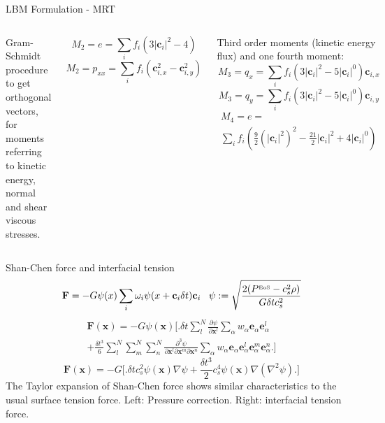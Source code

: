 \documentclass{beamer}
\begin{document}
	\begin{frame}{LBM Formulation - MRT}
		
		\begin{columns}
		Gram-Schmidt procedure to get orthogonal vectors, for moments referring to kinetic energy, normal and shear viscous stresses.
		
		\begin{equation*}
			M_2 = e = \sum_i f_i (3 |\mathbf{c}_i|^2-4)
		\end{equation*}
		\begin{equation*}
			M_2 = p_{xx} = \sum_i f_i (\mathbf{c}_{i,x}^2 - \mathbf{c}_{i,y}^2)
		\end{equation*}
		
		Third order moments (kinetic energy flux) and one fourth moment:
		\begin{equation*}
		M_3 = q_x = \sum_i f_i (3 |\mathbf{c}_i|^2-5|\mathbf{c}_i|^0) \mathbf{c}_{i,x}
		\end{equation*}
		\begin{equation*}
		M_3 = q_y = \sum_i f_i (3 |\mathbf{c}_i|^2-5|\mathbf{c}_i|^0) \mathbf{c}_{i,y}
		\end{equation*}
		\begin{multline*}
		M_4 = e = \\
		\sum_i f_i (\frac{9}{2} (|\mathbf{c}_i|^2) ^2- \frac{21}{2}|\mathbf{c}_i|^2+ 4 |\mathbf{c}_i|^0)
		\end{multline*}
	\end{columns}
	\end{frame}

	\begin{frame}{Shan-Chen force and interfacial tension}
		\begin{equation*}
		\mathbf{F} = -G \psi(x) \sum_i \omega_i \psi(x+\mathbf{c}_i \delta t) \mathbf{c}_i \, \, \, \, \, \psi := \sqrt{\frac{2(P^{\text{\tiny EoS}}-c_s^2\rho)}{G \delta t c_s^2}}
		\end{equation*}
		\begin{multline*}
		\mathbf{F}(\mathbf{x}) = -G \psi (\mathbf{x}) \big[ \big.  \delta t \sum_{l}^{N} \frac{\partial \psi}{\partial \mathbf{x}^l} \sum_\alpha w_\alpha \mathbf{e}_\alpha \mathbf{e}_\alpha^l \\ + \frac{\delta t^3}{6} \sum_{l}^{N} \sum_{m}^{N} \sum_{n}^{N} \frac{\partial^3 \psi}{\partial \mathbf{x}^l \partial \mathbf{x}^m \partial \mathbf{x}^n} \sum_\alpha w_\alpha \mathbf{e}_\alpha \mathbf{e}_\alpha^l \mathbf{e}_\alpha^m \mathbf{e}_\alpha^n  \big. \big]
		\end{multline*}
		\begin{equation*}
		\mathbf{F}(\mathbf{x}) = -G \big[ \big.  \delta t c^2_s   \psi (\mathbf{x}) \nabla \psi + \frac{\delta t^3}{2} c^4_s \psi (\mathbf{x}) \nabla (\nabla^2\psi)  \big. \big]
		\end{equation*}
		The Taylor expansion of Shan-Chen force shows similar characteristics to the usual surface tension force. Left: Pressure correction. Right: interfacial tension force.
	\end{frame}
\end{document}

